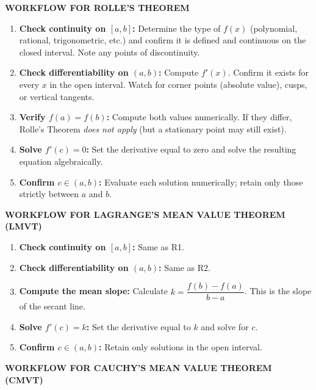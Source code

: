 \documentclass[12pt,a4paper]{article}
\begin{document}
\begin{tcolorbox}[colback=gray!5, colframe=black!70, title=Algorithm: Applying Mean Value Theorems, breakable]

\textbf{WORKFLOW FOR ROLLE'S THEOREM}

\begin{enumerate}[label=\textbf{R\arabic*.}]
  \item \textbf{Check continuity on $[a,b]$:} Determine the type of $f(x)$ (polynomial,
        rational, trigonometric, etc.) and confirm it is defined and continuous on the
        closed interval. Note any points of discontinuity.
  \item \textbf{Check differentiability on $(a,b)$:} Compute $f'(x)$. Confirm it exists
        for every $x$ in the open interval. Watch for corner points (absolute value), cusps,
        or vertical tangents.
  \item \textbf{Verify $f(a) = f(b)$:} Compute both values numerically. If they differ,
        Rolle's Theorem \emph{does not apply} (but a stationary point may still exist).
  \item \textbf{Solve $f'(c) = 0$:} Set the derivative equal to zero and solve the resulting
        equation algebraically.
  \item \textbf{Confirm $c \in (a,b)$:} Evaluate each solution numerically; retain only
        those strictly between $a$ and $b$.
\end{enumerate}

\medskip
\textbf{WORKFLOW FOR LAGRANGE'S MEAN VALUE THEOREM (LMVT)}

\begin{enumerate}[label=\textbf{L\arabic*.}]
  \item \textbf{Check continuity on $[a,b]$:} Same as R1.
  \item \textbf{Check differentiability on $(a,b)$:} Same as R2.
  \item \textbf{Compute the mean slope:} Calculate $k = \dfrac{f(b)-f(a)}{b-a}$.
        This is the slope of the secant line.
  \item \textbf{Solve $f'(c) = k$:} Set the derivative equal to $k$ and solve for $c$.
  \item \textbf{Confirm $c \in (a,b)$:} Retain only solutions in the open interval.
\end{enumerate}

\medskip
\textbf{WORKFLOW FOR CAUCHY'S MEAN VALUE THEOREM (CMVT)}


\end{tcolorbox}
\end{document}
